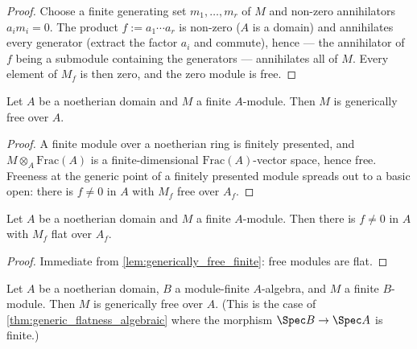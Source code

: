 \begin{proof}
\leanok
  Choose a finite generating set \(m_1, \dots, m_r\) of \(M\) and non-zero
  annihilators \(a_i m_i = 0\).  The product \(f := a_1 \cdots a_r\) is
  non-zero (\(A\) is a domain) and annihilates every generator (extract the
  factor \(a_i\) and commute), hence — the annihilator of \(f\) being a
  submodule containing the generators — annihilates all of \(M\).  Every
  element of \(M_f\) is then zero, and the zero module is free.
\end{proof}

\begin{lemma}\leanok
  \label{lem:generically_free_finite}
  Let \(A\) be a noetherian domain and \(M\) a finite \(A\)-module.  Then \(M\)
  is generically free over \(A\).
\end{lemma}

\begin{proof}
\leanok
  A finite module over a noetherian ring is finitely presented, and
  \(M \otimes_A \mathrm{Frac}(A)\) is a finite-dimensional
  \(\mathrm{Frac}(A)\)-vector space, hence free.  Freeness at the generic
  point of a finitely presented module spreads out to a basic open: there is
  \(f \ne 0\) in \(A\) with \(M_f\) free over \(A_f\).
\end{proof}

\begin{lemma}\leanok
  \label{lem:generically_flat_finite}
  Let \(A\) be a noetherian domain and \(M\) a finite \(A\)-module.  Then there
  is \(f \ne 0\) in \(A\) with \(M_f\) flat over \(A_f\).
\end{lemma}

\begin{proof}
\leanok
  Immediate from \cref{lem:generically_free_finite}: free modules are flat.
\end{proof}

\begin{lemma}\leanok
  \label{lem:generically_free_module_finite}
  Let \(A\) be a noetherian domain, \(B\) a module-finite \(A\)-algebra, and
  \(M\) a finite \(B\)-module.  Then \(M\) is generically free over \(A\).
  (This is the case of \cref{thm:generic_flatness_algebraic} where the
  morphism \(\Spec B \to \Spec A\) is finite.)
\end{lemma}

